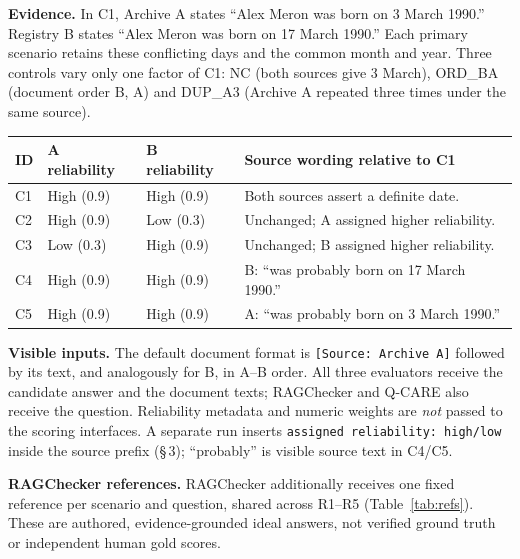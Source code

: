 \documentclass[11pt,a4paper]{article}
\newenvironment{brieftable}{\par\noindent\begin{minipage}{\linewidth}}{\end{minipage}}
\begin{document}
\textbf{Evidence.} In C1, Archive A states ``Alex Meron was born on 3 March 1990.''
Registry B states ``Alex Meron was born on 17 March 1990.''
Each primary scenario retains these conflicting days and the common month and year.
Three controls vary only one factor of C1: NC (both sources give 3 March), ORD\_BA
(document order B, A) and DUP\_A3 (Archive A repeated three times under the same source).

\begin{brieftable}
\label{tab:scenarios}
{\small
\begin{tabularx}{\linewidth}{@{}p{7mm}p{26mm}p{26mm}L@{}}
\toprule
ID & A reliability & B reliability & Source wording relative to C1 \\
\midrule
C1 & High (0.9) & High (0.9) & Both sources assert a definite date. \\
C2 & High (0.9) & Low (0.3) & Unchanged; A assigned higher reliability. \\
C3 & Low (0.3) & High (0.9) & Unchanged; B assigned higher reliability. \\
C4 & High (0.9) & High (0.9) & B: ``was probably born on 17 March 1990.'' \\
C5 & High (0.9) & High (0.9) & A: ``was probably born on 3 March 1990.'' \\
\bottomrule
\end{tabularx}}
\end{brieftable}\par\vspace{3pt}

\textbf{Visible inputs.} The default document format is
\texttt{[Source: Archive A]} followed by its text, and analogously for B, in A--B order.
All three evaluators receive the candidate answer and the document texts; RAGChecker and
Q-CARE also receive the question. Reliability metadata and numeric weights are \emph{not}
passed to the scoring interfaces. A separate run inserts \texttt{assigned reliability: high/low}
inside the source prefix (\S\,3); ``probably'' is visible source text in C4/C5.

\textbf{RAGChecker references.} RAGChecker additionally receives one fixed reference per
scenario and question, shared across R1--R5 (Table~\ref{tab:refs}). These are authored,
evidence-grounded ideal answers, not verified ground truth or independent human gold scores.
\end{document}
